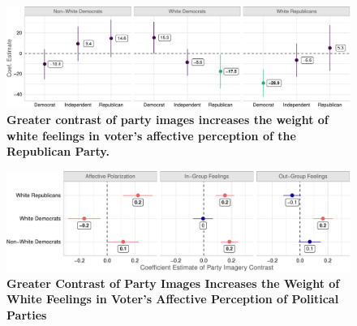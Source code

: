 \documentclass[
  12pt,
]{article}
\begin{document}
\begin{figure}[tb]

{\centering \includegraphics{paper_files/figure-pdf/fig-baseline-1.pdf}

}

\caption{\label{fig-baseline}\textbf{Greater contrast of party images
increases the weight of white feelings in voter's affective perception
of the Republican Party.}}

\end{figure}

\begin{figure}[tb]

{\centering \includegraphics{paper_files/figure-pdf/fig-decompose-1.pdf}

}

\caption{\label{fig-decompose}\textbf{Greater Contrast of Party Images
Increases the Weight of White Feelings in Voter's Affective Perception
of Political Parties}}

\end{figure}
\end{document}
